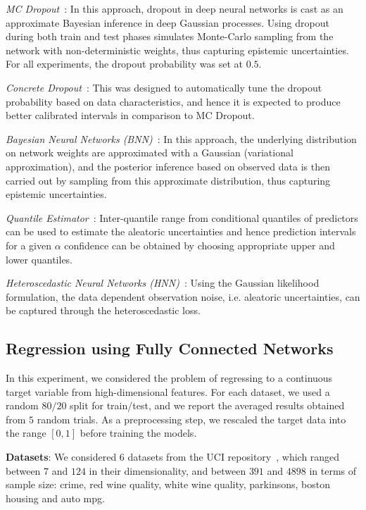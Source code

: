\documentclass[letterpaper]{article} %
\begin{document}
\noindent \textit{MC Dropout}~\cite{gal2016dropout}:
In this approach, dropout in deep neural networks is cast as an approximate Bayesian inference in deep Gaussian processes. Using dropout during both train and test phases simulates Monte-Carlo sampling from the network with non-deterministic weights, thus capturing epistemic uncertainties. For all experiments, the dropout probability was set at $0.5$.

\noindent \textit{Concrete Dropout}~\cite{gal2017concrete}:
This was designed to automatically tune the dropout probability based on data characteristics, and hence it is expected to produce better calibrated intervals in comparison to MC Dropout.

\noindent \textit{Bayesian Neural Networks (BNN)}~\cite{blundell2015weight}:
In this approach, the underlying distribution on network weights are approximated with a Gaussian (variational approximation), and the posterior inference based on observed data is then carried out by sampling from this approximate distribution, thus capturing epistemic uncertainties.

\noindent \textit{Quantile Estimator}~\cite{tagasovska2018frequentist}:
Inter-quantile range from conditional quantiles of predictors can be used to estimate the aleatoric uncertainties and hence prediction intervals for a given $\alpha$ confidence can be obtained by choosing appropriate upper and lower quantiles.

\noindent \textit{Heteroscedastic Neural Networks (HNN)}~\cite{cvuncertainties}:
Using the Gaussian likelihood formulation, the  data dependent observation noise, i.e. aleatoric uncertainties, can be captured through the heteroscedastic loss.

\subsection{Regression using Fully Connected Networks}
In this experiment, we considered the problem of regressing to a continuous target variable from high-dimensional features. For each dataset, we used a random $80/20$ split for train/test, and we report the averaged results obtained from $5$ random trials. As a preprocessing step, we rescaled the target data into the range $[0,1]$ before training the models.

\noindent \textbf{Datasets}: We considered $6$ datasets from the UCI repository~\cite{Dua:2019}, which ranged between $7$ and $124$ in their dimensionality, and between $391$ and $4898$ in terms of sample size: crime, red wine quality, white wine quality, parkinsons, boston housing and auto mpg.
\end{document}
